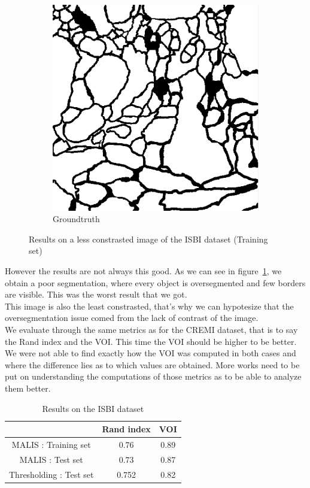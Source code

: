 \begin{figure}[!htbp]
\begin{subfigure}[t]{0.31\textwidth}
        \includegraphics[height=0.7\textwidth]{./images/isbi_gt_2.png}
        \caption{Groundtruth}
    \end{subfigure}
	\caption{Results on a less constrasted image of the ISBI dataset (Training
	set)}
    \label{fig:isbi_result_fail}
\end{figure}

However the results are not always this good. As we can see in
figure~\ref{fig:isbi_result_fail}, we obtain a poor segmentation, where every
object is oversegmented and few borders are visible. This was the worst result
that we got.\\
This image is also the least constrasted, that's why we can hypotesize that the
oversegmentation issue comed from the lack of contrast of the image.\\

We evaluate through the same metrics as for the CREMI dataset, that is to say the Rand index and the VOI.
This time the VOI should be higher to be better.\\
We were not able to find exactly how the VOI was computed in both cases and
where the difference lies as to which values are obtained. More works need to
be put on understanding the computations of those metrics as to be able to
analyze them better.

\begin{table}[!htbp]
	\centering
	\begin{tabular}{|c|c|c|}
		\hline
		& Rand index & VOI \\
		\hline
		MALIS : Training set & 0.76 & 0.89\\
		\hline
		MALIS : Test set & 0.73 & 0.87\\
		\hline
		Thresholding : Test set & 0.752 & 0.82\\
		\hline
	\end{tabular}
	\caption{Results on the ISBI dataset}
	\label{tab:isbi_res}
\end{table}

